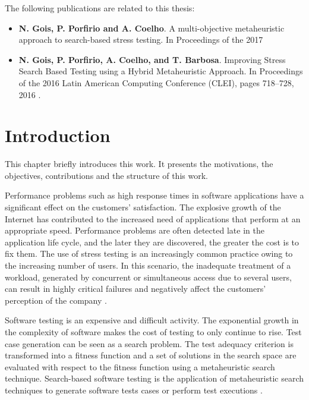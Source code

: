 \documentclass{report}
\begin{document}


The following publications are related to this thesis:


\begin{itemize}
\item \textbf{N. Gois, P. Porfirio and A. Coelho}. A multi-objective metaheuristic approach to search-based stress testing. In Proceedings of the 2017

\item \textbf{N. Gois, P. Porfirio, A. Coelho, and T. Barbosa}. Improving Stress Search Based Testing using a Hybrid Metaheuristic Approach. In Proceedings of the 2016 Latin American Computing Conference (CLEI), pages 718–728, 2016 \cite{Gois2016}.
\end{itemize}


\afterpreface



\chapter{Introduction}

This chapter briefly introduces this work. It presents the motivations, the objectives, contributions and the structure of this work.

Performance problems such as high response times in software applications have a significant effect on the customers’ satisfaction. The explosive growth of the Internet has contributed to the increased need of  applications that perform at an appropriate speed. Performance problems are often detected late in the application life cycle, and the later they are discovered, the greater the cost is to fix them. The use of stress testing is an increasingly common practice owing to the increasing number of users. In this scenario, the inadequate treatment of a workload,  generated by concurrent or simultaneous access due to several users, can result in highly critical failures and negatively affect the customers' perception of the company  \cite{Jiang2010} \cite{Molyneaux2009} \cite{Wert2014}.

Software testing is an expensive and difficult activity. The exponential
growth in the complexity of software makes the cost of testing to only continue to rise. Test case generation can be seen as a search problem. The test adequacy criterion is transformed into a fitness function and a set of solutions in the search
space are evaluated with respect to the fitness function using a metaheuristic search technique. Search-based software testing is the application of metaheuristic search techniques to generate software
tests cases or perform test executions \cite{Afzal2009a} \cite{Gay}.
\end{document}
